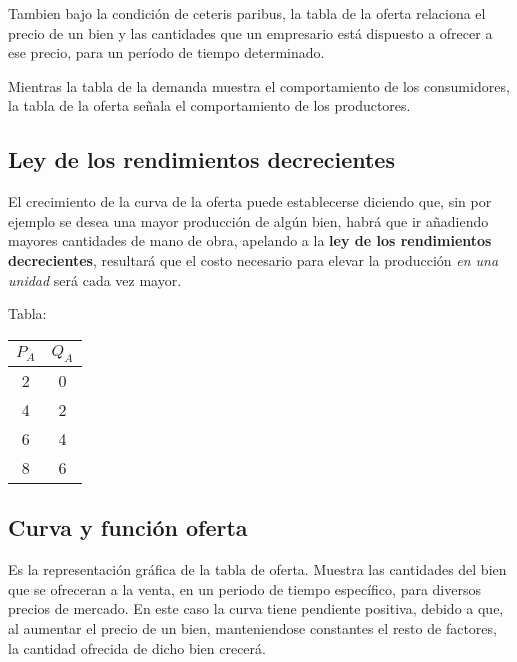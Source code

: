 Tambien bajo la condición de ceteris paribus,
la tabla de la oferta relaciona el precio de un bien y las cantidades que un empresario está dispuesto a ofrecer a ese precio,
para un período de tiempo determinado.

Mientras la tabla de la demanda muestra el comportamiento de los consumidores,
la tabla de la oferta señala el comportamiento de los productores.

\subsection{Ley de los rendimientos decrecientes}

El crecimiento de la curva de la oferta puede establecerse diciendo que,
sin por ejemplo se desea una mayor producción de algún bien,
habrá que ir añadiendo mayores cantidades de mano de obra,
apelando a la \textbf{ley de los rendimientos decrecientes},
resultará que el costo necesario para elevar la producción \textit{en una unidad} será cada vez mayor.

Tabla:
\begin{table}[h!] %
    \centering
    \begin{tabular}{c c} %
        \hline
        \( P_A\) & \(Q_A\) \\ %
        \hline
        2        & 0       \\ %
        4        & 2       \\
        6        & 4       \\
        8        & 6       \\
        \hline
    \end{tabular}
\end{table}

\subsection{Curva y función oferta}

Es la representación gráfica de la tabla de oferta.
Muestra las cantidades del bien que se ofreceran a la venta,
en un periodo de tiempo específico,
para diversos precios de mercado.
En este caso la curva tiene pendiente positiva,
debido a que,
al aumentar el precio de un bien,
manteniendose constantes el resto de factores,
la cantidad ofrecida de dicho bien crecerá.

